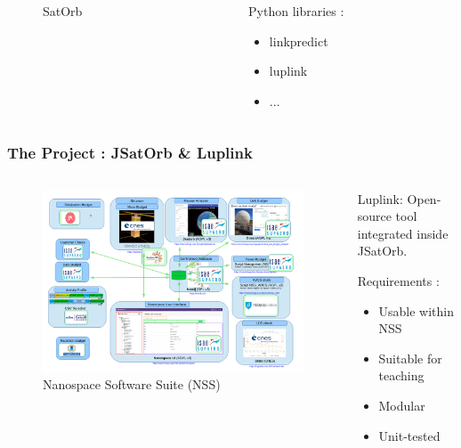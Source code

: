 \documentclass{beamer}
\begin{document}
\begin{frame}
\begin{columns}[onlytextwidth]
\begin{column}{.32\textwidth}
\begin{figure}
				\caption{SatOrb}
			\end{figure}
		\end{column}
		\hfill
		\begin{column}{.32\textwidth}
			Python libraries : 
			\begin{itemize}
				\item linkpredict
				\item luplink
				\item ...
			\end{itemize}
		\end{column}
	\end{columns}
\end{frame}

\begin{frame}
	\frametitle{The Project : JSatOrb \& Luplink}
	\begin{columns}[onlytextwidth]
		\begin{column}{.6\textwidth}
		\begin{figure}
			\includegraphics[width=\textwidth]{nss2.png}
			\caption{Nanospace Software Suite (NSS)}
		\end{figure}
	\end{column}
	\hfill
	\begin{column}{.35\textwidth}
	\alert{Luplink}: Open-source tool integrated inside JSatOrb.\\
	\bigskip
	
	Requirements : 
	\begin{itemize}
		\item Usable within NSS
		\item Suitable for teaching
		\item Modular
		\item Unit-tested
	\end{itemize}
	\end{column}
\end{columns}
\end{frame}
\end{document}
